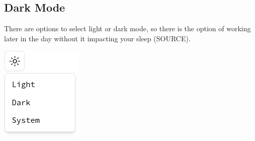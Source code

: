 \subsection{Dark Mode}
\begin{minipage}{0.77\textwidth} %
There are options to select light or dark mode, so there is the option of working later in the day without it impacting your sleep (SOURCE). 
\end{minipage}
\hfill
\begin{minipage}{0.2\textwidth} %
\includegraphics[width=\textwidth]{images/darkMode.png} %
\end{minipage}

